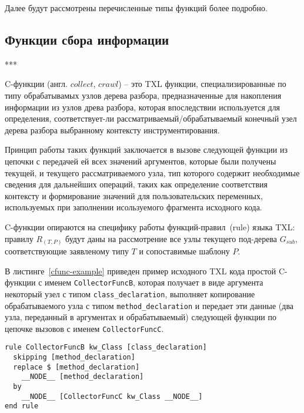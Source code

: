 Далее будут рассмотрены перечисленные типы функций более подробно.

\subsection{Функции сбора информации}

***

C-функции (англ. $collect$, $crawl$) -- это TXL функции, специализированные по типу обрабатывамых узлов дерева разбора, предназначенные для накопления информации из узлов древа разбора, которая впоследствии используется для определения, соответствует-ли рассматриваемый/обрабатываемый конечный узел дерева разбора выбранному контексту инструментирования.

Принцип работы таких функций заключается в вызове следующей функции из цепочки с передачей ей всех значений аргументов, которые были получены текущей, и текущего рассматриваемого узла, тип которого содержит необходимые сведения для дальнейших операций, таких как определение соответствия контексту и формирование значений для пользовательских переменных, используемых при заполнении исользуемого фрагмента исходного кода.

C-функции опираются на специфику работы функций-правил~(rule) языка TXL: правилу $R_{(T,P)}$ будут даны на рассмотрение все узлы текущего под-дерева $G_{sub}$, соответствующие заявленому типу $T$ и сопоставимые шаблону $P$.

В листинге~\ref{cfunc-example} приведен пример исходного TXL кода простой C-функции с именем \lstinline{CollectorFuncB}, которая получает в виде аргумента некоторый узел с типом \lstinline{class_declaration}, выполняет копирование обрабатываемого узла с типом \lstinline{method_declaration} и передает эти данные (два узла, переданный в аргументах и обрабатываемый) следующей функции по цепочке вызовов с именем \lstinline{CollectorFuncC}.

\begin{lstlisting}[frame=single, language=TXL, label={cfunc-example}, caption={Пример синтезированной C-функции.}]
rule CollectorFuncB kw_Class [class_declaration]
  skipping [method_declaration]
  replace $ [method_declaration]
    __NODE__ [method_declaration]
  by
    __NODE__ [CollectorFuncC kw_Class __NODE__]
end rule
\end{lstlisting}

